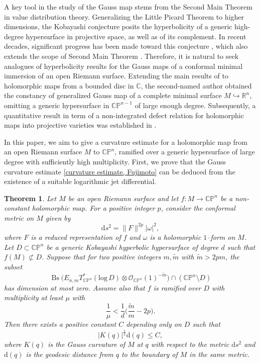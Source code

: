 \documentclass[english, 12pt]{amsart}
\DeclareMathOperator{\bs}{Bs}
\def\log{\mathrm{log}\,}
\theoremstyle{plain}
\newtheorem{thm}{Theorem}[section]
\theoremstyle{remark}
\numberwithin{equation}{section}
\theoremstyle{plain}
\theoremstyle{named}
\begin{document}
A key tool in the study of the Gauss map stems from the Second Main Theorem in value distribution theory. Generalizing the Little Picard Theorem to higher dimensions, the Kobayashi conjecture posits the hyperbolicity of a generic high-degree hypersurface in projective space, as well as of its complement. In recent decades, significant progress has been made toward this conjecture \cite{Berczi-Kirwan24, Brotbek17, Brotbek-Deng19, cadorel2024, Darondeau2016, Demailly20, DMR2010, Riedl-Yang22, Siu2015}, which also extends the scope of Second Main Theorem \cite{Huynh-Vu-Xie-2017}. Therefore, it is  natural to seek analogues of hyperbolicity results for the Gauss maps of a conformal minimal immersion of an open Riemann surface. Extending the main results of \cite{Huynh-Vu-Xie-2017} to holomorphic maps from a bounded disc in $\mathbb{C}$, the second-named author obtained the constancy of generalized Gauss map of a complete minimal surface $M\hookrightarrow\mathbb{R}^n$, omitting a generic hypersurface in $\mathbb{CP}^{n-1}$ of large enough degree. Subsequently, a quantitative result in term of a non-integrated defect relation for holomorphic maps into projective varieties was established in \cite{Cai-Ru-Yang25}.

In this paper, we aim to give a curvature estimate for a holomorphic map from an open Riemann surface $M$ to $\mathbb{CP}^n$, ramified over a generic hypersurface of large degree with sufficiently high multiplicity. First, we prove that the Gauss curvature estimate \eqref{curvature estimate, Fujimoto} can be deduced from the existence of a suitable logarithmic jet differential.

\begin{thm}
	\label{gauss curvature estimate}
	Let $M$ be an open Riemann surface and let $f\colon M\rightarrow\mathbb{CP}^n$ be a non-constant holomorphic map. For a positive integer $p$, consider the conformal metric on $M$ given by
	\[
	\mathrm{d}s^2=\|F\|^{2p}|\omega|^2,
	\]
	where $F$ is a reduced representation of $f$ and $\omega$ is a holomorphic $1$--form on $M$. Let $D\subset\mathbb{CP}^n$ be a generic Kobayashi hyperbolic hypersurface of degree $d$ such that $f(M)\not\subset D$.
	Suppose that for two positive integers $m,\tilde{m}$ with $\tilde{m}>2pm$, the subset
	\[
	\bs	\big(
	E_{n,m}T_{\mathbb{C}\mathbb{P}^n}^*(\log D)
	\otimes
	\mathcal{O}_{\mathbb{C}\mathbb{P}^n}(1)^{-\widetilde{m}}
	\big)\cap \left(\mathbb{C}\mathbb{P}^n\setminus D\right)
	\]
	has dimension at most zero. Assume also that $f$ is ramified over $D$ with multiplicity at least $\mu$ with
	\[
	\dfrac{1}{\mu}<\dfrac{1}{d}\bigg(\dfrac{\widetilde{m}}{m}-2p\bigg).
	\] 
	Then there exists a positive constant $C$ depending only on $D$ such that
	\begin{equation}\label{eq:curvature-main}
		|K(q)|^{\frac{1}{2}}\mathrm{d}(q)\leq C,
	\end{equation}
	where $K(q)$ is the Gauss curvature of $M$ at $q$ with respect to the metric $\mathrm{d}s^2$ and $\mathrm{d}(q)$ is the geodesic distance from $q$ to the boundary of $M$ in the same metric.
\end{thm}
\end{document}
